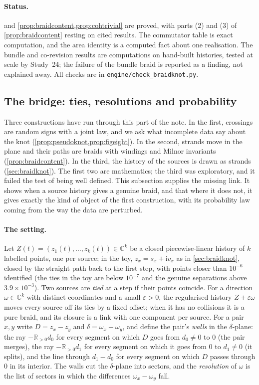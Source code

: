 \documentclass[11pt]{article}
\theoremstyle{definition}\newtheorem{definition}[theorem]{Definition}\newtheorem{remark}[theorem]{Remark}\newtheorem{example}[theorem]{Example}\newtheorem{problem}[theorem]{Open problem}\crefname{problem}{Problem}{Problems}
\begin{document}
\paragraph{Status.}  and \cref{prop:braidcontent,prop:cohtrivial} are proved, with parts (2) and (3) of \cref{prop:braidcontent} resting on cited results. The commutator table is exact computation, and the area identity is a computed fact about one realisation. The bundle and co-revision results are computations on hand-built histories, tested at scale by Study~24; the failure of the bundle braid is reported as a finding, not explained away. All checks are in \texttt{engine/check\_braidknot.py}.


\subsection{The bridge: ties, resolutions and probability}\label{sec:tiebridge}
Three constructions have run through this part of the note. In the first, crossings are random signs with a joint law, and we ask what incomplete data say about the knot (\cref{prop:pseudoknot,prop:figeight}). In the second, strands move in the plane and their paths are braids with windings and Milnor invariants (\cref{prop:braidcontent}). In the third, the history of the sources is drawn as strands (\cref{sec:braidknot}). The first two are mathematics; the third was exploratory, and it failed the test of being well defined. This subsection supplies the missing link. It shows when a source history gives a genuine braid, and that where it does not, it gives exactly the kind of object of the first construction, with its probability law coming from the way the data are perturbed.

\paragraph{The setting.} Let $Z(t)=(z_1(t),\dots,z_k(t))\in\mathbb C^k$ be a closed piecewise-linear history of $k$ labelled points, one per source; in the toy, $z_x=s_x+\mathrm iv_x$ as in \cref{sec:braidknot}, closed by the straight path back to the first step, with points closer than $10^{-6}$ identified (the ties in the toy are below $10^{-7}$ and the genuine separations above $3.9\times10^{-3}$). Two sources are \emph{tied} at a step if their points coincide. For a direction $\omega\in\mathbb C^k$ with distinct coordinates and a small $\varepsilon>0$, the regularised history $Z+\varepsilon\omega$ moves every source off its ties by a fixed offset; when it has no collisions it is a pure braid, and its closure is a link with one component per source. For a pair $x,y$ write $D=z_x-z_y$ and $\delta=\omega_x-\omega_y$, and define the pair's \emph{walls} in the $\delta$-plane: the ray $-\mathbb R_{>0}d_0$ for every segment on which $D$ goes from $d_0\ne0$ to $0$ (the pair merges), the ray $-\mathbb R_{>0}d_1$ for every segment on which it goes from $0$ to $d_1\ne0$ (it splits), and the line through $d_1-d_0$ for every segment on which $D$ passes through $0$ in its interior. The walls cut the $\delta$-plane into sectors, and the \emph{resolution} of $\omega$ is the list of sectors in which the differences $\omega_x-\omega_y$ fall.
\end{document}
